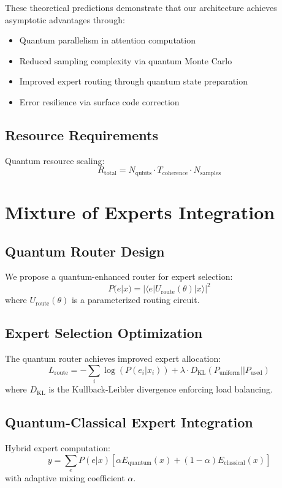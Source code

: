 \documentclass{article}
\begin{document}
These theoretical predictions demonstrate that our architecture achieves asymptotic advantages through:
\begin{itemize}
\item Quantum parallelism in attention computation
\item Reduced sampling complexity via quantum Monte Carlo
\item Improved expert routing through quantum state preparation
\item Error resilience via surface code correction
\end{itemize}

\subsection{Resource Requirements}
Quantum resource scaling:
\begin{equation}
R_{\text{total}} = N_{\text{qubits}} \cdot T_{\text{coherence}} \cdot N_{\text{samples}}
\end{equation}

\section{Mixture of Experts Integration}

\subsection{Quantum Router Design}
We propose a quantum-enhanced router for expert selection:
\begin{equation}
P(e|x) = |\langle e|U_{\text{route}}(\theta)|x\rangle|^2
\end{equation}
where $U_{\text{route}}(\theta)$ is a parameterized routing circuit.

\subsection{Expert Selection Optimization}
The quantum router achieves improved expert allocation:
\begin{equation}
L_{\text{route}} = -\sum_i \log(P(e_i|x_i)) + \lambda \cdot D_{\text{KL}}(P_{\text{uniform}}||P_{\text{used}})
\end{equation}
where $D_{\text{KL}}$ is the Kullback-Leibler divergence enforcing load balancing.

\subsection{Quantum-Classical Expert Integration}
Hybrid expert computation:
\begin{equation}
y = \sum_e P(e|x)[\alpha E_{\text{quantum}}(x) + (1-\alpha)E_{\text{classical}}(x)]
\end{equation}
with adaptive mixing coefficient $\alpha$.
\end{document}
